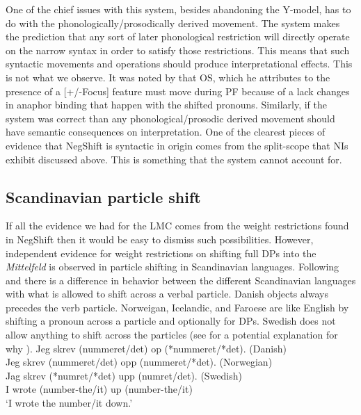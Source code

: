 \documentclass[12pt, letterpaper]{article}
\begin{document}
One of the chief issues with this system, besides abandoning the Y-model, has to do with the phonologically/prosodically derived movement. The \citeauthor{zubizarretaProsodyFocusWord1998} system makes the prediction that any sort of later phonological restriction will directly operate on the narrow syntax in order to satisfy those restrictions. This means that such syntactic movements and operations should produce interpretational effects. This is not what we observe. It was noted by \citep{holmbergRemarksHolmbergGeneralization1999} that OS, which he attributes to the presence of a [+/-Focus] feature must move during PF because of a lack changes in anaphor binding that happen with the shifted pronouns. Similarly, if the \citeauthor{zubizarretaProsodyFocusWord1998} system was correct than any phonological/prosodic derived movement should have semantic consequences on interpretation. One of the clearest pieces of evidence that NegShift is syntactic in origin comes from the split-scope that NIs exhibit \citep{iatridouNegativeDPsAMovement2011,zeijlstraSyntacticallyComplexStatus2011} discussed above. This is something that the \citeauthor{zubizarretaProsodyFocusWord1998} system cannot account for. 

\subsection{Scandinavian particle shift} \label{sec:Particles}

If all the evidence we had for the LMC comes from the weight restrictions found in NegShift then it would be easy to dismiss such possibilities. However, independent evidence for weight restrictions on shifting full DPs into the \emph{Mittelfeld} is observed in particle shifting in Scandinavian languages. Following \citet[2]{holmbergRemarksHolmbergGeneralization1999} and \citet{faarlundSyntaxMainlandScandinavian2019} there is a difference in behavior between the different Scandinavian languages with what is allowed to shift across a verbal particle. Danish objects always precedes the verb particle. Norweigan, Icelandic, and Faroese are like English by shifting a pronoun across a particle and optionally for DPs. Swedish does not allow anything to shift across the particles (see \cite{erteschik-shirVariationMainlandScandinavian2020} for a potential explanation for why ). 
\ea \gllll Jeg skrev (nummeret/det) op (*nummeret/*det). \hfill (Danish)\\
		Jeg skrev (nummeret/det) opp (nummeret/*det). \hfill (Norwegian)\\
		Jag skrev (*numret/*det) upp (numret/det). \hfill (Swedish)\\
		I wrote (number-the/it) up (number-the/it)\\
\glt `I wrote the number/it down.'
\z 
\end{document}
